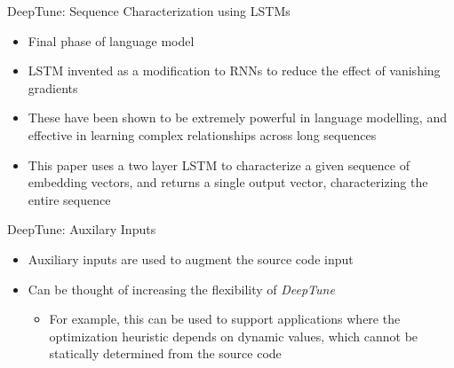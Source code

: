 \documentclass[10pt]{beamer}
\begin{document}
\begin{frame}{DeepTune: Sequence Characterization using LSTMs}
\begin{itemize}
\item<1->{Final phase of language model}
\item<2->{LSTM invented as a modification to RNNs to reduce the effect of vanishing gradients}
\item<3->{These have been shown to be extremely powerful in language modelling, and effective in learning complex relationships across long sequences}
\item<4->{This paper uses a two layer LSTM to characterize a given sequence of embedding vectors, and returns a single output vector, characterizing the entire sequence}
\end{itemize}
\end{frame}

\begin{frame}{DeepTune: Auxilary Inputs}
\begin{itemize}
\item<1->{Auxiliary inputs are used to augment the source code input}
\item<2->{Can be thought of increasing the flexibility of \emph{DeepTune}
          \begin{itemize}
          \item<2->{For example, this can be used to support applications where the optimization heuristic depends on dynamic values, which cannot be statically determined from the source code}
          \end{itemize}}
\end{itemize}
\end{frame}
\end{document}

